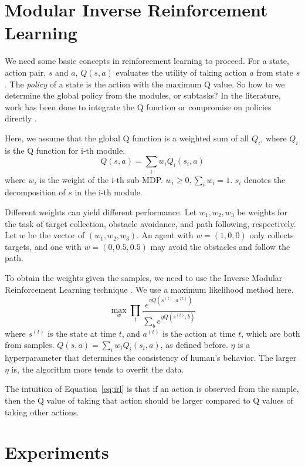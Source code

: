 \documentclass[11pt]{article} %
\begin{document}
\section{Modular Inverse Reinforcement Learning}
\label{sec:rl}

We need some basic concepts in reinforcement learning to proceed. For a state, action
pair, $s$ and $a$, $Q(s, a)$ evaluates the utility of taking action $a$ from
state $s$. The {\em policy} of a state is the action with the maximum Q
value\cite{rl}. So how to we determine the global policy from the modules, or
subtasks? In the literature, work has been done to integrate the Q function
\cite{koller1999computing} or compromise on policies directly
\cite{thomas2012motor}.

Here, we assume that the global Q function is a weighted sum of all $Q_i$, where
$Q_i$ is the Q function for i-th module.
$$Q(s, a) = \sum_i w_i Q_i (s_i, a)$$
where $w_i$ is the weight of the i-th sub-MDP. $w_i \geq 0, \sum_i w_i = 1$.
$s_i$ denotes the decomposition of $s$ in the i-th module.

Different weights can yield different performance. Let $w_1, w_2, w_3$ be
weights for the task of target collection, obstacle avoidance, and path
following, respectively. Let $w$ be the vector of $(w_1, w_2, w_3)$. An agent
with $w = (1, 0, 0)$ only collects targets, and one with $w = (0, 0.5, 0.5)$ may
avoid the obstacles and follow the path.

To obtain the weights given the samples, we need to use the Inverse Modular
Reinforcement Learning technique \cite{rothkopf2013modular}. We use a maximum
likelihood method here.
\begin{equation}
\label{eq:irl}
\max_w \prod_t \frac{e^{\eta Q(s^{(t)}, a^{(t)})}}{\sum_b e^{\eta Q(s^{(t)}, b)}}
\end{equation}
where $s^{(t)}$ is the state at time $t$, and $a^{(t)}$ is the action at time
$t$, which are both from samples. $Q(s, a) = \sum_i w_i Q_i(s_i, a)$, as defined
before. $\eta$ is a hyperparameter that determines the consistency of human's
behavior. The larger $\eta$ is, the algorithm more tends to overfit the data.

The intuition of Equation~\ref{eq:irl} is that if an action is observed from the
sample, then the Q value of taking that action should be larger compared to Q
values of taking other actions.

\section{Experiments}
\label{sec:exp}
\end{document}
